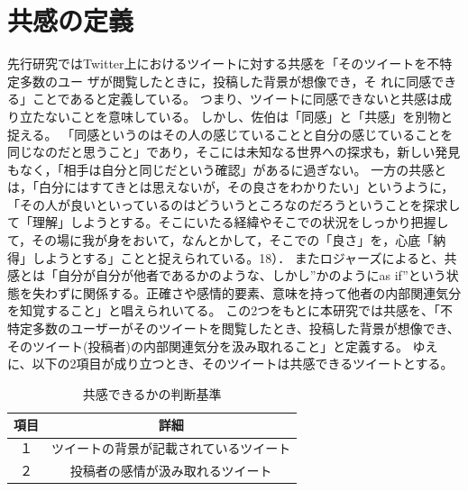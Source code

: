 \documentclass[dvipdfmx]{issj}
\begin{document}
\section{共感の定義}  %

先行研究ではTwitter上におけるツイートに対する共感を「そのツイートを不特定多数のユー ザが閲覧したときに，投稿した背景が想像でき，そ れに同感できる」ことであると定義している。
つまり、ツイートに同感できないと共感は成り立たないことを意味している。
しかし、佐伯は「同感」と「共感」を別物と捉える。
「同感というのはその人の感じていることと自分の感じていることを同じなのだと思うこと」であり，そこには未知なる世界への探求も，新しい発見もなく，「相手は自分と同じだという確認」があるに過ぎない。
一方の共感とは，「白分にはすてきとは思えないが，その良さをわかりたい」というように，「その人が良いといっているのはどういうところなのだろうということを探求して「理解」しようとする。そこにいたる経緯やそこでの状況をしっかり把握して，その場に我が身をおいて，なんとかして，そこでの「良さ」を，心底「納得」しようとする」ことと捉えられている。18）．
またロジャーズによると、共感とは「自分が自分が他者であるかのような、しかし”かのようにas if”という状態を失わずに関係する。正確さや感情的要素、意味を持って他者の内部関連気分を知覚すること」と唱えられいてる。
この2つをもとに本研究では共感を、「不特定多数のユーザーがそのツイートを閲覧したとき、投稿した背景が想像でき、そのツイート(投稿者)の内部関連気分を汲み取れること」と定義する。
ゆえに、以下の2項目が成り立つとき、そのツイートは共感できるツイートとする。

\begin{table}[htbp]\centering
\caption{共感できるかの判断基準}\label{tbl:font}
\begin{small}
\begin{tabular}{|c|c|} \hline
項目   & 詳細\\\hline\hline
１& ツイートの背景が記載されているツイート\\\hline
２ & 投稿者の感情が汲み取れるツイート\\\hline
\end{tabular}
\end{small}
\end{table}







\end{document}
